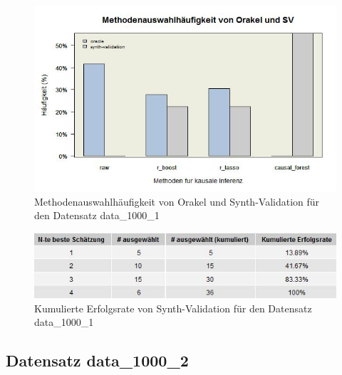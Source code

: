 \documentclass[12pt,a4paper,twoside]{scrartcl}
\numberwithin{equation}{section}
\newcounter{mypagecount}%
\newenvironment{interlude}{%
  \clearpage
  \setcounter{mypagecount}{\value{page}}%
  \thispagestyle{empty}%
  \pagestyle{empty}%
}{%
  \clearpage
  \setcounter{page}{\value{mypagecount}}%
}
\begin{document}
\begin{interlude}
\begin{appendices}
\begin{center}
\begin{figure}[H]
    \centering
    \includegraphics[height=0.5\textwidth, width=1\textwidth]{figures/plots/appendix/rawData1000aBarplot.jpeg}
    \caption[Methodenauswahlhäufigkeit von Orakel und Synth-Validation für den Datensatz data\_1000\_1]{Methodenauswahlhäufigkeit von Orakel und Synth-Validation für den Datensatz data\_1000\_1}
  \end{figure}
\end{center}

\begin{center}
\begin{figure}[H]
    \centering
    \includegraphics[height=0.2\textwidth, width=1\textwidth]{figures/plots/appendix/rawData1000aGrid.jpeg}
    \vspace{1mm}
    \caption[Kumulierte Erfolgsrate von Synth-Validation für den Datensatz data\_1000\_1]{Kumulierte Erfolgsrate von Synth-Validation für den Datensatz data\_1000\_1}
  \end{figure}
\end{center}

\subsection{Datensatz data\_1000\_2}


\end{appendices}
\end{interlude}
\end{document}
